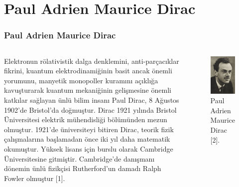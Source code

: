 \documentclass[aspectratio=169,10pt]{beamer}
\begin{document}
	
    \section{Paul Adrien Maurice Dirac}
    
    \begin{frame}[allowframebreaks]
\frametitle{Paul Adrien Maurice Dirac}

\begin{columns}

 Elektronun rölativistik dalga denklemini, anti-parçacıklar fikrini, kuantum elektrodinamiğinin basit ancak önemli yorumunu, manyetik monopoller kuramını açıklığa kavuşturarak kuantum mekaniğinin gelişmesine önemli katkılar sağlayan ünlü bilim insanı Paul Dirac, 8 Ağustos 1902'de Bristol'da doğmuştur. Dirac 1921 yılında Bristol Üniversitesi elektrik mühendisliği bölümünden mezun olmuştur. 1921'de üniversiteyi bitiren Dirac, teorik fizik çalışmalarına başlamadan önce iki yıl daha matematik okumuştur. Yüksek lisans için burslu olarak Cambridge Üniversitesine gitmiştir. Cambridge'de danışmanı dönemin ünlü fizikçisi Rutherford'un damadı Ralph Fowler olmuştur [1].

\centering
 \begin{figure}
\includegraphics[width=3.5cm]{PAM-Dirac.jpg}
\caption*{Paul Adrien Maurice Dirac [2].}
	\end{figure}

\end{columns}

\end{frame}
\end{document}

